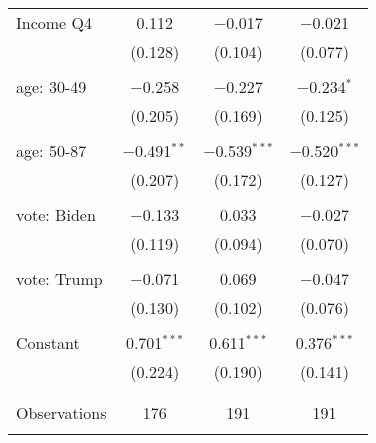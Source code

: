 \begin{tabular}{@{\extracolsep{5pt}}lccc}
 Income Q4 & 0.112 & $-$0.017 & $-$0.021 \\ 
  & (0.128) & (0.104) & (0.077) \\ 
  & & & \\ 
 age: 30-49 & $-$0.258 & $-$0.227 & $-$0.234$^{*}$ \\ 
  & (0.205) & (0.169) & (0.125) \\ 
  & & & \\ 
 age: 50-87 & $-$0.491$^{**}$ & $-$0.539$^{***}$ & $-$0.520$^{***}$ \\ 
  & (0.207) & (0.172) & (0.127) \\ 
  & & & \\ 
 vote: Biden & $-$0.133 & 0.033 & $-$0.027 \\ 
  & (0.119) & (0.094) & (0.070) \\ 
  & & & \\ 
 vote: Trump & $-$0.071 & 0.069 & $-$0.047 \\ 
  & (0.130) & (0.102) & (0.076) \\ 
  & & & \\ 
 Constant & 0.701$^{***}$ & 0.611$^{***}$ & 0.376$^{***}$ \\ 
  & (0.224) & (0.190) & (0.141) \\ 
  & & & \\ 
\hline \\[-1.8ex] 

Observations & 176 & 191 & 191 \\ 
\hline 
\hline \\[-1.8ex] 
\end{tabular} 